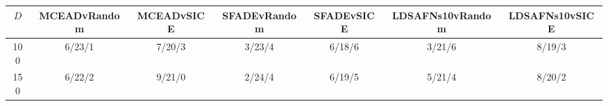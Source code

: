 \begin{tabular}{c c c c c c c}\hline\hline
	$D$	&	MCEADvRandom	&	MCEADvSICE	&	SFADEvRandom	&	SFADEvSICE	&	LDSAFNs10vRandom	&	LDSAFNs10vSICE	\\ \hline
	100	&	6/23/1	&	7/20/3	&	3/23/4	&	6/18/6	&	3/21/6	&	8/19/3	\\
	150	&	6/22/2	&	9/21/0	&	2/24/4	&	6/19/5	&	5/21/4	&	8/20/2	\\ \hline
	\end{tabular}
	
	